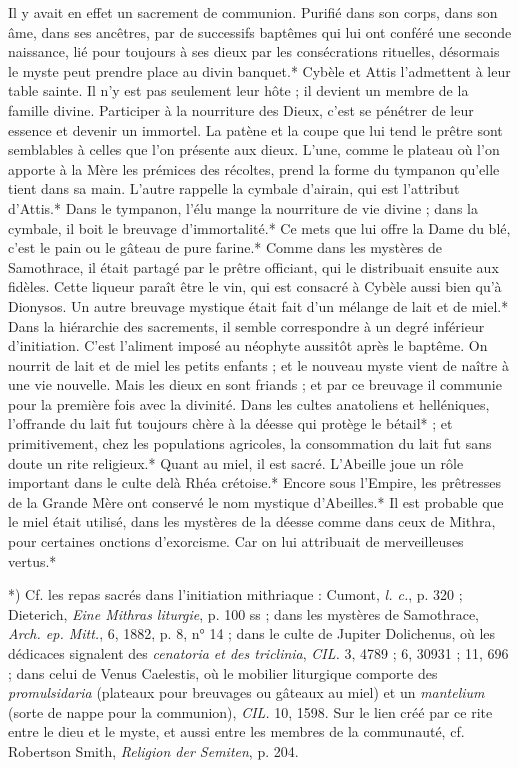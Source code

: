 \documentclass[a4paper, 11pt, oneside, polutonikogreek, french]{article}
\begin{document}
Il y avait en effet un sacrement de communion. Purifié dans son corps, dans son âme, dans ses ancêtres, par de successifs baptêmes qui lui ont conféré une seconde naissance, lié pour toujours à ses dieux par les consécrations rituelles, désormais le myste peut prendre place au divin banquet.* Cybèle et Attis l'admettent à leur table sainte. Il n'y est pas seulement leur hôte ; il devient un membre de la famille divine. Participer à la nourriture des Dieux, c'est se pénétrer de leur essence et devenir un immortel. La patène et la coupe que lui tend le prêtre sont semblables à celles que l'on présente aux dieux. L'une, comme le plateau où l'on apporte à la Mère les prémices des récoltes, prend la forme du tympanon qu'elle tient dans sa main. L'autre rappelle la cymbale d'airain, qui est l'attribut d'Attis.* Dans le tympanon, l'élu mange la nourriture de vie divine ; dans la cymbale, il boit le breuvage d'immortalité.* Ce mets que lui offre la Dame du blé, c'est le pain ou le gâteau de pure farine.* Comme dans les mystères de Samothrace, il était partagé par le prêtre officiant, qui le distribuait ensuite aux fidèles. Cette liqueur paraît être le vin, qui est consacré à Cybèle aussi bien qu'à Dionysos. Un autre breuvage mystique était fait d'un mélange de lait et de miel.* Dans la hiérarchie des sacrements, il semble correspondre à un degré inférieur d'initiation. C'est l'aliment imposé au néophyte aussitôt après le baptême. On nourrit de lait et de miel les petits enfants ; et le nouveau myste vient de naître à une vie nouvelle. Mais les dieux en sont friands ; et par ce breuvage il communie pour la première fois avec la divinité. Dans les cultes anatoliens et helléniques, l'offrande du lait fut toujours chère à la déesse qui protège le bétail* ; et primitivement, chez les populations agricoles, la consommation du lait fut sans doute un rite religieux.* Quant au miel, il est sacré. L'Abeille joue un rôle important dans le culte delà Rhéa crétoise.* Encore sous l'Empire, les prêtresses de la Grande Mère ont conservé le nom mystique d'Abeilles.* Il est probable que le miel était utilisé, dans les mystères de la déesse comme dans ceux de Mithra, pour certaines onctions d'exorcisme. Car on lui attribuait de merveilleuses vertus.*

*) Cf. les repas sacrés dans l'initiation mithriaque : Cumont, \emph{l. c.}, p. 320 ; Dieterich, \emph{Eine Mithras liturgie}, p. 100 ss ; dans les mystères de Samothrace, \emph{Arch. ep. Mitt.}, 6, 1882, p. 8, n° 14 ; dans le culte de Jupiter Dolichenus, où les dédicaces signalent des \emph{cenatoria et des triclinia}, \emph{CIL.} 3, 4789 ; 6, 30931 ; 11, 696 ; dans celui de Venus Caelestis, où le mobilier liturgique comporte des \emph{promulsidaria} (plateaux pour breuvages ou gâteaux au miel) et un \emph{mantelium} (sorte de nappe pour la communion), \emph{CIL.} 10, 1598. Sur le lien créé par ce rite entre le dieu et le myste, et aussi entre les membres de la communauté, cf. Robertson Smith, \emph{Religion der Semiten}, p. 204.
\end{document}
